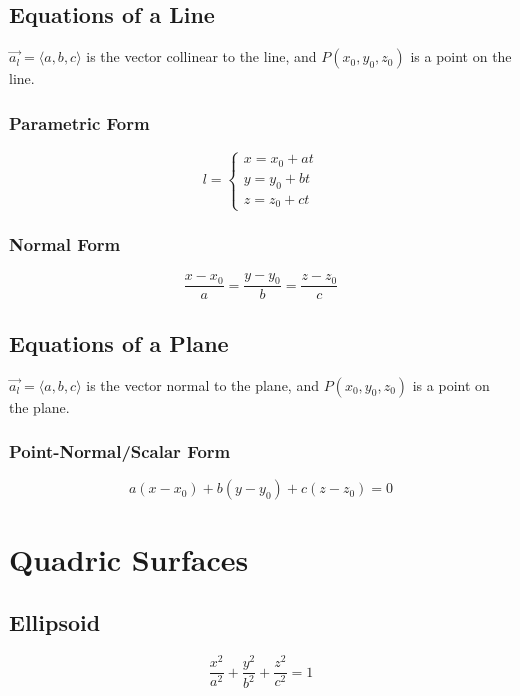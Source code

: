 \subsection{Equations of a Line}
\(\vec{a_l} = \langle a, b, c \rangle\) is the vector collinear to the line, and \(P(x_0, y_0, z_0)\) is a point on the line.
\subsubsection{Parametric Form}
\begin{equation}\label{Parametric Form of a Line}
    l = 
    \begin{cases}
        x = x_0 + at\\
        y = y_0 + bt\\
        z = z_0 + ct
    \end{cases}
\end{equation}

\subsubsection{Normal Form}
\begin{equation}\label{Normal Form of a Line}
    \dfrac{x-x_0}{a} = \dfrac{y-y_0}{b} = \dfrac{z-z_0}{c}
\end{equation}

\subsection{Equations of a Plane}
\(\vec{a_l} = \langle a, b, c \rangle\) is the vector normal to the plane, and \(P(x_0, y_0, z_0)\) is a point on the plane.
\subsubsection{Point-Normal/Scalar Form}
\begin{equation}\label{Point-Normal Form of a Plane}
    a(x-x_0) + b(y-y_0) + c(z-z_0) = 0
\end{equation}

\section{Quadric Surfaces}

\subsection{Ellipsoid}
\begin{equation}\label{Equation of an Ellipsoid}
    \dfrac{x^2}{a^2} + \dfrac{y^2}{b^2} + \dfrac{z^2}{c^2} = 1
\end{equation}

